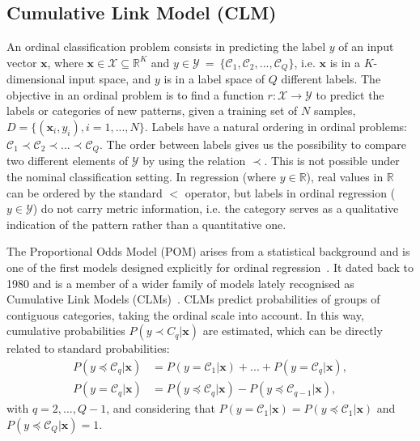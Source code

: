 \documentclass[preprint]{elsarticle}
\begin{document}
\subsection{Cumulative Link Model (CLM)}
\label{sect:ordinalproblem}
An ordinal classification problem consists in predicting the label $y$ of an input vector $\mathbf{x}$, where $\mathbf{x} \in \mathcal{X} \subseteq \mathds{R}^K$ and $y \in \mathcal{Y}~=~\{\mathcal{C}_1, \mathcal{C}_2, ..., \mathcal{C}_Q\}$, i.e. $\mathbf{x}$ is in a $K$-dimensional input space, and $y$ is in a label space of $Q$ different labels. The objective in an ordinal problem is to find a function $r : \mathcal{X} \rightarrow \mathcal{Y}$ to predict the labels or categories of new patterns, given a training set of $N$ samples, $D = \{(\mathbf{x}_i, y_i), i = 1, ..., N\}$. Labels have a natural ordering in ordinal problems: $\mathcal{C}_1 \prec \mathcal{C}_2 \prec ... \prec \mathcal{C}_Q$. The order between labels gives us the possibility to compare two different elements of $\mathcal{Y}$ by using the relation $\prec$. This is not possible under the nominal classification setting. In regression (where $y \in \mathds{R}$), real values in $\mathds{R}$ can be ordered by the standard $<$ operator, but labels in ordinal regression ($y \in \mathcal{Y}$) do not carry metric information, i.e. the category serves as a qualitative indication of the pattern rather than a quantitative one.

The Proportional Odds Model (POM) arises from a statistical background and is one of the first models designed explicitly for ordinal regression~\cite{mccullagh1980regression}. It dated back to 1980 and is a member of a wider family of models lately recognised as Cumulative Link Models (CLMs)~\cite{agresti2010analysis}. CLMs predict probabilities of groups of contiguous categories, taking the ordinal scale into account. In this way, cumulative probabilities $P(y \prec C_q |\mathbf{x})$ are estimated, which can be directly related to standard probabilities:
\begin{align}
\nonumber P(y \preceq \mathcal{C}_q | \mathbf{x}) &= P(y = \mathcal{C}_1 | \mathbf{x}) + ... + P(y = \mathcal{C}_q | \mathbf{x}),\\
\nonumber P(y = \mathcal{C}_q | \mathbf{x}) &= P(y \preceq \mathcal{C}_q | \mathbf{x}) - P(y \preceq \mathcal{C}_{q-1} | \mathbf{x}),
\end{align}
with $q = 2, ..., Q-1$, and considering that $P(y = \mathcal{C}_1 | \mathbf{x}) = P(y \preceq \mathcal{C}_1 | \mathbf{x})$ and $P(y \preceq \mathcal{C}_Q | \mathbf{x}) = 1$.
\end{document}
